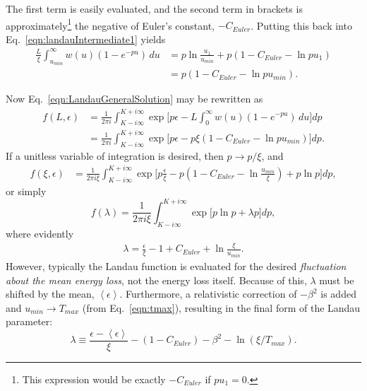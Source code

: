 The first term is easily evaluated, and the second term in brackets is approximately\footnote{This expression would be exactly $-C_{Euler}$ if $pu_1=0$.} the negative of Euler's constant, $-C_{Euler}$. Putting this back into Eq.~\eqref{eqn:landauIntermediate1} yields
\begin{align*}
\frac{L}{\xi}\int_{u_{min}} ^\infty w(u)  (1-e^{-pu})\, du &=p \ln\frac{u_1}{u_{min}} + p(1-C_{Euler}-\ln pu_1)\\
&=p(1-C_{Euler}-\ln pu_{min}).
\end{align*}

Now Eq.~\eqref{eqn:LandauGeneralSolution} may be rewritten as
\begin{align*}
f(L,\epsilon)&=\frac{1}{2\pi i} \int_{K-i\infty} ^{K+i\infty} \exp\Big[p\epsilon-L\int_0 ^\infty w(u)  (1-e^{-pu})\, du\Big] dp\\
&= \frac{1}{2\pi i} \int_{K-i\infty} ^{K+i\infty} \exp\Big[p\epsilon-p\xi(1-C_{Euler}-\ln pu_{min})\Big] dp.
\end{align*}
If a unitless variable of integration is desired, then $p\rightarrow p/\xi$, and
\begin{align*}
f(\xi,\epsilon)&=\frac{1}{2\pi i \xi} \int_{K-i\infty} ^{K+i\infty} \exp\Big[p\frac{\epsilon}{\xi}-p(1-C_{Euler}-\ln \frac{u_{min}}{\xi})+p\ln p\Big] dp,
\end{align*}
or simply
\begin{equation}\label{eqn:landau}
f(\lambda)=\frac{1}{2\pi i \xi} \int_{K-i\infty} ^{K+i\infty} \exp\Big[p\ln p + \lambda p\Big] dp,
\end{equation}
where evidently
\begin{align*}
\lambda = \frac{\epsilon}{\xi} -1+C_{Euler}+\ln \frac{\xi}{u_{min}}.
\end{align*}
However, typically the Landau function is evaluated for the desired \emph{fluctuation about the mean energy loss}, not the energy loss itself. Because of this, $\lambda$ must be shifted by the mean, $\left< \epsilon \right>$. Furthermore, a relativistic correction of $-\beta ^2$ is added and $u_{min}\rightarrow T_{max}$ (from Eq.~\eqref{eqn:tmax}), resulting in the final form of the Landau parameter:
\begin{equation}\label{eqn:landauParameter}
\lambda \equiv \frac{\epsilon-\left<\epsilon\right>}{\xi}-(1-C_{Euler})-\beta ^2 -\ln (\xi/T_{max}).
\end{equation}

